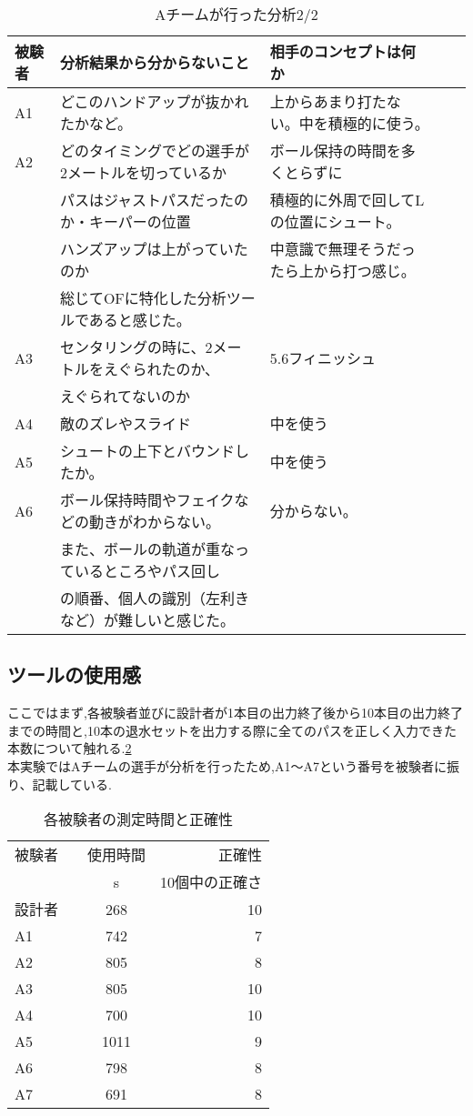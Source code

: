 \documentclass[../main.tex]{subfiles}
\begin{document}
  \begin{table}[h]
    \caption{Aチームが行った分析2/2}\label{table:青の分析内容二つ目}
    \centering
      \begin{tabular}{lllll}
    被験者 & 分析結果から分からないこと & 相手のコンセプトは何か\\
    \hline\hline
    A1&どこのハンドアップが抜かれたかなど。	&上からあまり打たない。中を積極的に使う。\\
    A2&どのタイミングでどの選手が2メートルを切っているか&ボール保持の時間を多くとらずに\\
    &パスはジャストパスだったのか・キーパーの位置&積極的に外周で回してLの位置にシュート。\\
    &ハンズアップは上がっていたのか&中意識で無理そうだったら上から打つ感じ。\\
    &総じてOFに特化した分析ツールであると感じた。&\\
    A3&センタリングの時に、2メートルをえぐられたのか、&5.6フィニッシュ\\
    &えぐられてないのか&\\
    A4&敵のズレやスライド	&中を使う\\
    A5&シュートの上下とバウンドしたか。&中を使う\\
    A6&ボール保持時間やフェイクなどの動きがわからない。&分からない。\\
    &また、ボールの軌道が重なっているところやパス回し&\\
    &の順番、個人の識別（左利きなど）が難しいと感じた。&\\
    \hline
    \end{tabular}
    \end{table}


\subsection{ツールの使用感}
ここではまず,各被験者並びに設計者が1本目の出力終了後から10本目の出力終了までの時間と,10本の退水セットを出力する際に全てのパスを正しく入力できた本数について触れる.\ref{table:大学生の時間と正確性}\\
本実験ではAチームの選手が分析を行ったため,A1〜A7という番号を被験者に振り、記載している.

\begin{table}[h]
\caption{各被験者の測定時間と正確性}\label{table:大学生の時間と正確性}\centering
  \begin{tabular}{lcr}
  \hline \hline
  被験者 & 使用時間 & 正確性 \\
    & s & 10個中の正確さ \\
  \hline \hline
  設計者　& 268  & 10 \\
  A1 & 742 & 7 \\
  A2 & 805 & 8 \\
  A3 & 805 &10 \\
  A4 & 700 & 10 \\
  A5 & 1011 & 9 \\
  A6 & 798 & 8 \\
  A7 & 691 &8 \\
  \hline
  \end{tabular}
\end{table}
\end{document}
